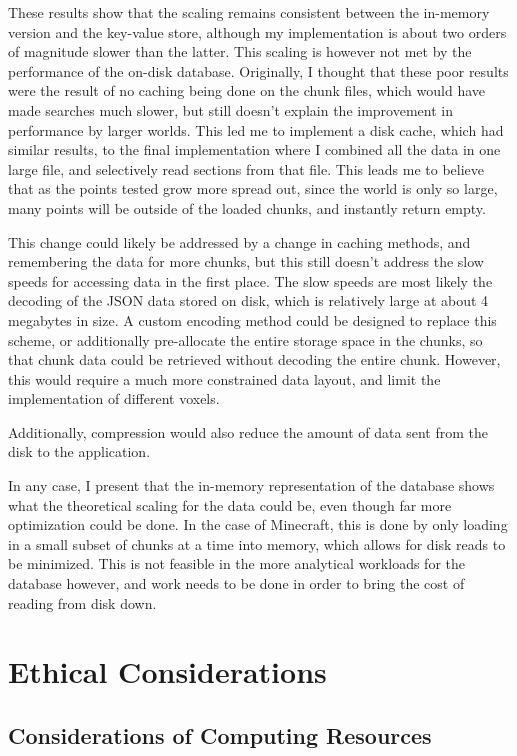 \documentclass[10pt,twocolumn]{article}
\begin{document}
These results show that the scaling remains consistent between the in-memory
version and the key-value store, although my implementation is about two orders
of magnitude slower than the latter. This scaling is however not met by the
performance of the on-disk database. Originally, I thought that these poor
results were the result of no caching being done on the chunk files, which would
have made searches much slower, but still doesn't explain the improvement in
performance by larger worlds. This led me to implement a disk cache, which had
similar results, to the final implementation where I combined all the data in
one large file, and selectively read sections from that file. This leads me to
believe that as the points tested grow more spread out, since the world is only
so large, many points will be outside of the loaded chunks, and instantly return
empty.

This change could likely be addressed by a change in caching methods, and
remembering the data for more chunks, but this still doesn't address the slow
speeds for accessing data in the first place. The slow speeds are most likely
the decoding of the JSON data stored on disk, which is relatively large at
about 4 megabytes in size. A custom encoding method could be designed to replace
this scheme, or additionally pre-allocate the entire storage space in the
chunks, so that chunk data could be retrieved without decoding the entire chunk.
However, this would require a much more constrained data layout, and limit the
implementation of different voxels.

Additionally, compression would also reduce the amount of data sent from the
disk to the application.

In any case, I present that the in-memory representation of the database shows
what the theoretical scaling for the data could be, even though far more
optimization could be done. In the case of Minecraft, this is done by only
loading in a small subset of chunks at a time into memory, which allows for disk
reads to be minimized. This is not feasible in the more analytical workloads for
the database however, and work needs to be done in order to bring the cost of
reading from disk down.

\section{Ethical Considerations}

\subsection{Considerations of Computing Resources}
\end{document}
